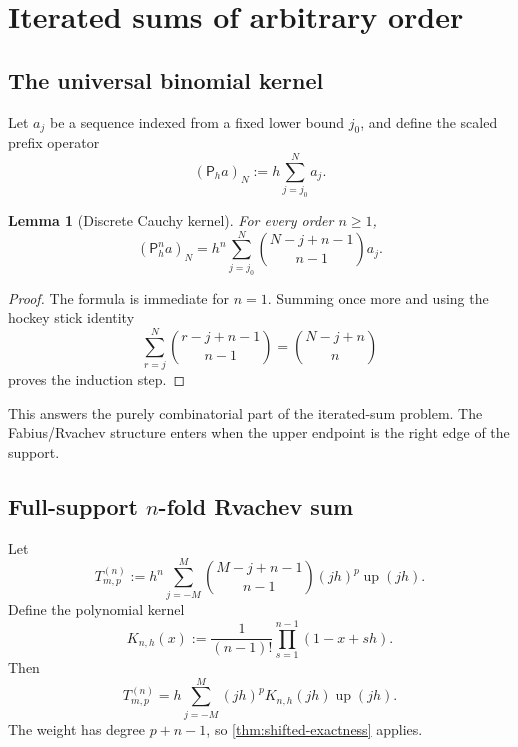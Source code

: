 \documentclass[11pt]{article}
\newtheorem{lemma}[theorem]{Lemma}
\theoremstyle{definition}
\newcommand{\Up}{\operatorname{up}}
\begin{document}
\section{Iterated sums of arbitrary order}
\label{sec:iterated}

\subsection{The universal binomial kernel}

Let $a_j$ be a sequence indexed from a fixed lower bound $j_0$, and define the
scaled prefix operator
\[
 (\mathsf P_h a)_N:=h\sum_{j=j_0}^{N}a_j.
\]

\begin{lemma}[Discrete Cauchy kernel]
\label{lem:prefix-kernel}
For every order $n\ge1$,
\begin{equation}
 (\mathsf P_h^n a)_N
 =h^n\sum_{j=j_0}^{N}
 \binom{N-j+n-1}{n-1}a_j.
 \label{eq:prefix-kernel}
\end{equation}
\end{lemma}

\begin{proof}
The formula is immediate for $n=1$.  Summing once more and using the hockey
stick identity
\[
 \sum_{r=j}^{N}\binom{r-j+n-1}{n-1}
 =\binom{N-j+n}{n}
\]
proves the induction step.
\end{proof}

This answers the purely combinatorial part of the iterated-sum problem.  The
Fabius/Rvachev structure enters when the upper endpoint is the right edge of
the support.

\subsection{Full-support \texorpdfstring{$n$}{n}-fold Rvachev sum}

Let
\begin{equation}
 T_{m,p}^{(n)}
 :=h^n\sum_{j=-M}^{M}
 \binom{M-j+n-1}{n-1}(jh)^p\Up(jh).
 \label{eq:T-iter-up}
\end{equation}
Define the polynomial kernel
\begin{equation}
 K_{n,h}(x)
 :=\frac1{(n-1)!}\prod_{s=1}^{n-1}(1-x+sh).
 \label{eq:Knh}
\end{equation}
Then
\begin{equation}
 T_{m,p}^{(n)}
 =h\sum_{j=-M}^{M}(jh)^pK_{n,h}(jh)\Up(jh).
 \label{eq:T-as-comb}
\end{equation}
The weight has degree $p+n-1$, so \cref{thm:shifted-exactness} applies.
\end{document}
